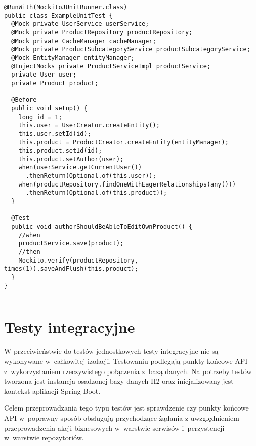 \noindent\hspace{.075\textwidth}\begin{minipage}{.85\textwidth}
\begin{verbatim}
@RunWith(MockitoJUnitRunner.class)
public class ExampleUnitTest {
  @Mock private UserService userService;
  @Mock private ProductRepository productRepository;
  @Mock private CacheManager cacheManager;
  @Mock private ProductSubcategoryService productSubcategoryService;
  @Mock EntityManager entityManager;
  @InjectMocks private ProductServiceImpl productService;
  private User user;
  private Product product;

  @Before
  public void setup() {
    long id = 1;
    this.user = UserCreator.createEntity();
    this.user.setId(id);
    this.product = ProductCreator.createEntity(entityManager);
    this.product.setId(id);
    this.product.setAuthor(user);
    when(userService.getCurrentUser())
      .thenReturn(Optional.of(this.user));
    when(productRepository.findOneWithEagerRelationships(any()))
      .thenReturn(Optional.of(this.product));
  }

  @Test
  public void authorShouldBeAbleToEditOwnProduct() {
    //when
    productService.save(product);
    //then
    Mockito.verify(productRepository, times(1)).saveAndFlush(this.product);
  }
}
\end{verbatim}
\begin{lstlisting}[caption={Przykładowy test jednostkowy \source{\ownwork}}, label={listing:unit-test}]
\end{lstlisting}
\end{minipage}

\section{Testy integracyjne}

W przeciwieństwie do testów jednostkowych testy integracyjne nie są wykonywane w~całkowitej izolacji\cite{book:testy-jednostkowe}.
Testowaniu podlegają punkty końcowe API z~wykorzystaniem rzeczywistego połączenia z~bazą danych.
Na potrzeby testów tworzona jest instancja osadzonej bazy danych H2\cite{tech:h2-db} oraz inicjalizowany jest kontekst aplikacji Spring Boot.

\par
Celem przeprowadzania tego typu testów jest sprawdzenie czy punkty końcowe API w~poprawny sposób obsługują przychodzące żądania
z uwzględnieniem przeprowadzenia akcji biznesowych w~warstwie serwisów i~perzystencji w~warstwie repozytoriów.

